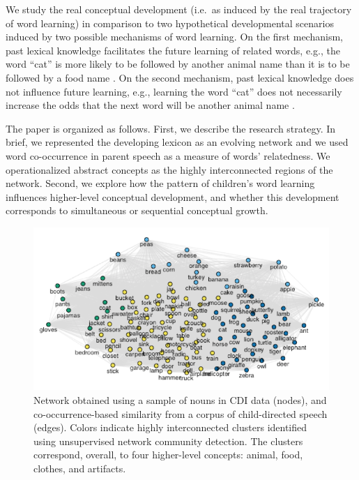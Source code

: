\documentclass[11pt]{article}
\newenvironment{CodeChunk}{}{}
\begin{document}
We study the real conceptual development (i.e.~as induced by the real
trajectory of word learning) in comparison to two hypothetical
developmental scenarios induced by two possible mechanisms of word
learning. On the first mechanism, past lexical knowledge facilitates the
future learning of related words, e.g., the word ``cat'' is more likely
to be followed by another animal name than it is to be followed by a
food name \cite{steyvers2005,borovsky2016}. On the second mechanism,
past lexical knowledge does not influence future learning, e.g.,
learning the word ``cat'' does not necessarily increase the odds that
the next word will be another animal name \cite{hills2009,sizemore2018}.

The paper is organized as follows. First, we describe the research
strategy. In brief, we represented the developing lexicon as an evolving
network and we used word co-occurrence in parent speech as a measure of
words' relatedness. We operationalized abstract concepts as the highly
interconnected regions of the network. Second, we explore how the
pattern of children's word learning influences higher-level conceptual
development, and whether this development corresponds to simultaneous or
sequential conceptual growth.

\begin{CodeChunk}
\captionsetup{width=0.8\textwidth}\begin{figure}[h]

{\centering \includegraphics{figs/network-1} 

}

\caption[Network obtained using a sample of nouns in CDI data (nodes), and co-occurrence-based similarity from a corpus of child-directed speech (edges)]{Network obtained using a sample of nouns in CDI data (nodes), and co-occurrence-based similarity from a corpus of child-directed speech (edges). Colors indicate highly interconnected clusters identified using unsupervised network community detection. The clusters correspond, overall, to four higher-level concepts: animal, food, clothes, and artifacts.}\label{fig:network}
\end{figure}
\end{CodeChunk}
\end{document}
